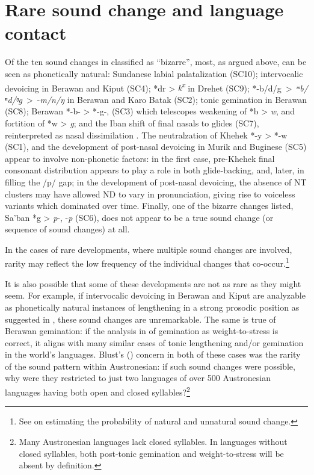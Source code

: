 \documentclass[output=paper]{langscibook}
\begin{document}
\section{\label{sec:blevins:4}Rare sound change and language contact}
Of the ten sound changes in  classified as “bizarre”, most, as argued above, can be seen as phonetically natural: Sundanese labial palatalization (SC10); intervocalic devoicing in Berawan and Kiput (SC4); *dr > \textit{k\textsuperscript{x}} in Drehet (SC9); \mbox{*-b/d/g > \textit{ᵐb/ⁿd/ᵑg} > -\textit{m/n/ŋ}} in Berawan and Karo Batak (SC2); tonic gemination in Berawan (SC8); Berawan *-b- > *-g-, (SC3) which telescopes weakening of *b > \textit{w}, and fortition of *w > \textit{g}; and the Iban shift of final nasals to glides (SC7), reinterpreted as nasal dissimilation . The neutralzation of Khehek *-y > *-w (SC1), and the development of post-nasal devoicing in Murik and Buginese (SC5) appear to involve non-phonetic factors: in the first case, pre-Khehek final consonant distribution appears to play a role in both glide-backing, and, later, in filling the \mbox{/p/} gap; in the development of post-nasal devoicing, the absence of NT clusters may have allowed ND to vary in pronunciation, giving rise to voiceless variants which dominated over time. Finally, one of the bizarre changes listed, Sa’ban *g > \textit{p}-, -\textit{p} (SC6), does not appear to be a true sound change (or sequence of sound changes) at all.

In the cases of rare developments, where multiple sound changes are involved, rarity may reflect the low frequency of the individual changes that co-occur.\footnote{See \citet{Beguš2020} on estimating the probability of natural and unnatural sound change.}

It is also possible that some of these developments are not as rare as they might seem. For example, if intervocalic devoicing in Berawan and Kiput are analyzable as phonetically natural instances of lengthening in a strong prosodic position as suggested in , these sound changes are unremarkable. The same is true of Berawan gemination: if the analysis in  of gemination as weight-to-stress is correct, it aligns with many similar cases of tonic lengthening and/or gemination in the world’s languages. Blust’s (\citeyear*{Blust2005,Blust2018}) concern in both of these cases was the rarity of the sound pattern within Austronesian: if such sound changes were possible, why were they restricted to just two languages of over 500 Austronesian languages having both open and closed syllables?\footnote{Many Austronesian languages lack closed syllables. In languages without closed syllables, both post-tonic gemination and weight-to-stress will be absent by definition.}
\end{document}
